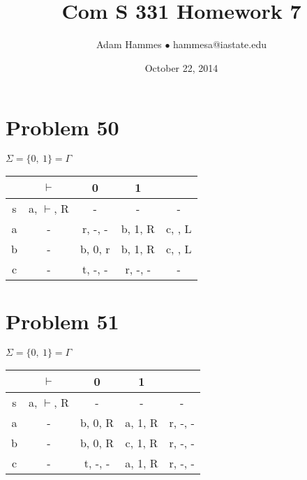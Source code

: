 \documentclass[11pt]{article}
\begin{document}
\title{Com S 331 Homework 7}
\author{Adam Hammes $\bullet$ hammesa@iastate.edu}
\date{October 22, 2014}
\maketitle

\section*{Problem 50}

$\Sigma = \{0,\ 1\} = \Gamma$

\begin{tabular}{ c | c | c | c | c }
			& $\vdash$ 			& 0 					& 1 				& \textvisiblespace \\
			\hline
	s		& a, $\vdash$, R 	& -					& -				& - \\
	a		& - 						& r, -, -				& b, 1, R		&  c, \textvisiblespace , L\\
	b		& -						& b, 0, r			& b, 1, R		& c, \textvisiblespace , L \\
	c		& -						& t, -, -				& r, -, -			& -
\end{tabular}


\section*{Problem 51}

$\Sigma = \{0,\ 1\} = \Gamma$

\begin{tabular}{ c | c | c | c | c }
			& $\vdash$				& 0 					& 1				& \textvisiblespace \\
		\hline
		s	& a, $\vdash$, R		& -					& -				& - \\
		a	& -							& b, 0, R			& a, 1, R		& r, -, - \\
		b	& -							& b, 0, R			& c, 1, R		& r, -, - \\
		c	& -							& t, -, -				& a, 1, R		& r, -, -
\end{tabular}
\end{document}
